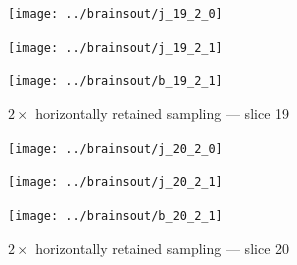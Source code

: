 \documentclass{article}
\begin{document}
\begin{figure}
\begin{centering}

\parbox{\imsizes}{\texttt{[image: ../brainsout/j\_19\_2\_0]}}

\vspace{\vertseps}

\parbox{\imsizes}{\texttt{[image: ../brainsout/j\_19\_2\_1]}}
\hfill
\parbox{\imsizes}{\texttt{[image: ../brainsout/b\_19\_2\_1]}}

\end{centering}
\caption{$2\times$ horizontally retained sampling --- slice 19}
\end{figure}


\begin{figure}
\begin{centering}

\parbox{\imsizes}{\texttt{[image: ../brainsout/j\_20\_2\_0]}}

\vspace{\vertseps}

\parbox{\imsizes}{\texttt{[image: ../brainsout/j\_20\_2\_1]}}
\hfill
\parbox{\imsizes}{\texttt{[image: ../brainsout/b\_20\_2\_1]}}

\end{centering}
\caption{$2\times$ horizontally retained sampling --- slice 20}
\end{figure}



\clearpage





\end{document}
